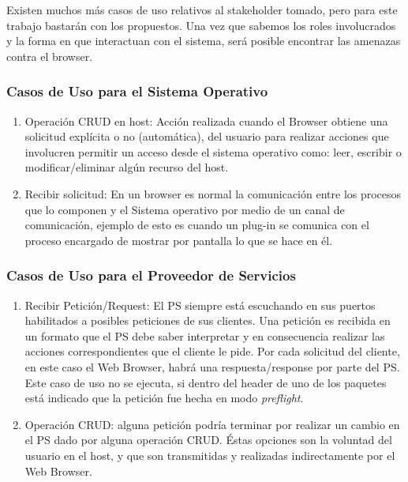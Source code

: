 		Existen muchos más casos de uso relativos al stakeholder tomado, pero para este trabajo bastarán con los propuestos. Una vez que sabemos los roles involucrados y la forma en que interactuan con el sistema, será posible encontrar las amenazas contra el browser.

		\subsubsection{Casos de Uso para el Sistema Operativo}
			\begin{enumerate}
				\item Operación CRUD en host: Acción realizada cuando el Browser obtiene una solicitud explícita o no (automática), del usuario para realizar acciones que involucren permitir un acceso desde el sistema operativo como: leer, escribir o modificar/eliminar algún recurso del host.

				\item Recibir solicitud: En un browser es normal la comunicación entre los procesos que lo componen y el Sistema operativo por medio de un canal de comunicación, ejemplo de esto es cuando un plug-in se comunica con el proceso encargado de mostrar por pantalla lo que se hace en él.
			\end{enumerate}

		\subsubsection{Casos de Uso para el Proveedor de Servicios}

			\begin{enumerate}
				\item Recibir Petición/Request: El PS siempre está escuchando en sus puertos habilitados a posibles peticiones de sus clientes. Una petición es recibida en un formato que el PS debe saber interpretar y en consecuencia realizar las acciones correspondientes que el cliente le pide. Por cada solicitud del cliente, en este caso el Web Browser, habrá una respuesta/response por parte del PS. Este caso de uso no se ejecuta, si dentro del header de uno de los paquetes está indicado que la petición fue hecha en modo \textit{preflight}.

				\item Operación CRUD: alguna petición podría terminar por realizar un cambio en el PS dado por alguna operación CRUD. Éstas opciones son la voluntad del usuario en el host, y que son transmitidas y realizadas indirectamente por el Web Browser.
			\end{enumerate}

